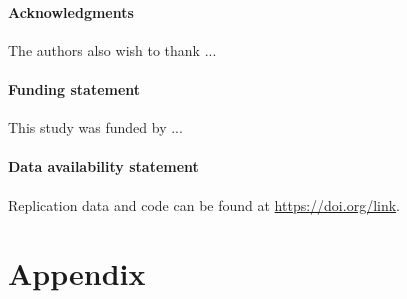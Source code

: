 \documentclass[ruler]{CUP-JNL-LIN}%
\begin{document}
\begin{Backmatter}

\paragraph{Acknowledgments}
The authors also wish to thank ...

\paragraph{Funding statement}
This study was funded by ...

\paragraph{Data availability statement}
Replication data and code can be found at \url{https://doi.org/link}.

\clearpage

\section*{Appendix}


\end{Backmatter}
\end{document}
